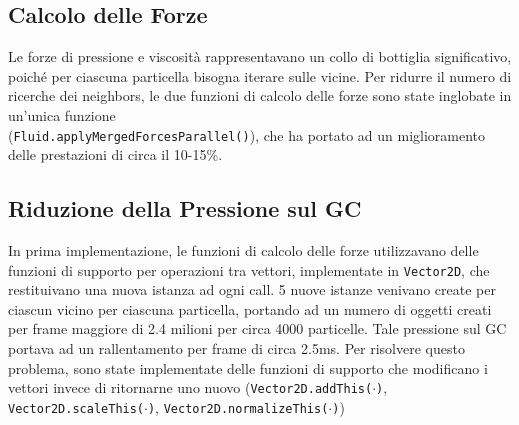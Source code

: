     \subsection{Calcolo delle Forze}
        Le forze di pressione e viscosità rappresentavano un collo di bottiglia significativo,
        poiché per ciascuna particella bisogna iterare sulle vicine. Per ridurre il numero di 
        ricerche dei neighbors, le due funzioni di calcolo delle forze sono state inglobate
        in un'unica funzione \\
        (\texttt{Fluid.applyMergedForcesParallel()}), che ha portato ad un miglioramento delle
        prestazioni di circa il 10-15\%.

    \subsection{Riduzione della Pressione sul GC}
        In prima implementazione, le funzioni di calcolo delle forze utilizzavano delle funzioni
        di supporto per operazioni tra vettori, implementate in \texttt{Vector2D}, che
        restituivano una nuova istanza ad ogni call. 5 nuove istanze venivano create per ciascun
        vicino per ciascuna particella, portando ad un numero di oggetti creati per frame maggiore
        di 2.4 milioni per circa 4000 particelle. Tale pressione sul GC portava ad un rallentamento 
        per frame di circa 2.5ms. Per risolvere questo problema, sono state implementate delle
        funzioni di supporto che modificano i vettori invece di ritornarne uno nuovo
        (\texttt{Vector2D.addThis($\cdot$)}, \texttt{Vector2D.scaleThis($\cdot$)}, \texttt{Vector2D.normalizeThis($\cdot$)})